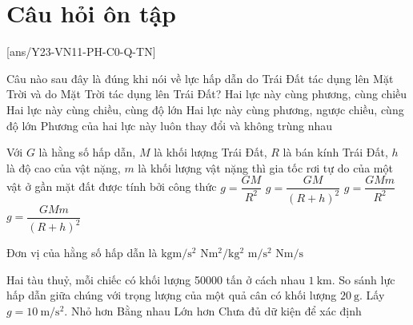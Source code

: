 \chapter{Câu hỏi ôn tập}
[ans/Y23-VN11-PH-C0-Q-TN]
\begin{ex}
	Câu nào sau đây là đúng khi nói về lực hấp dẫn do Trái Đất tác dụng lên Mặt Trời và do Mặt Trời tác dụng lên Trái Đất?
	\choice
	{Hai lực này cùng phương, cùng chiều}
	{Hai lực này cùng chiều, cùng độ lớn}
	{\True Hai lực này cùng phương, ngược chiều, cùng độ lớn}
	{Phương của hai lực này luôn thay đổi và không trùng nhau}
	\loigiai{}
\end{ex}
\begin{ex}
Với $G$ là hằng số hấp dẫn, $M$ là khối lượng Trái Đất, $R$ là bán kính Trái Đất, $h$ là độ cao của vật nặng, $m$ là khối lượng vật nặng thì gia tốc rơi tự do của một vật ở gần mặt đất được tính bởi công thức	
	\choice
	{\True $g=\dfrac{GM}{R^2}$}
	{$g=\dfrac{GM}{\left(R+h\right)^2}$}
	{$g=\dfrac{GMm}{R^2}$}
	{$g=\dfrac{GMm}{\left(R+h\right)^2}$}
	\loigiai{}
\end{ex}
\begin{ex}
	Đơn vị của hằng số hấp dẫn là
	\choice
	{$\si{\kilogram\meter/\second^2}$}
	{\True $\si{\newton\meter^2/\kilogram^2}$}
	{$\si{\meter/\second^2}$}
	{$\si{\newton\meter/\second}$}
	\loigiai{}
\end{ex}
\begin{ex}
	Hai tàu thuỷ, mỗi chiếc có khối lượng 50000 tấn ở cách nhau $\SI{1}{\kilo\meter}$. So sánh lực hấp dẫn giữa chúng với trọng lượng của một quả cân có khối lượng $\SI{20}{\gram}$. Lấy $g=\SI{10}{\meter/\second^2}$.
	\choice
	{\True Nhỏ hơn}
	{Bằng nhau}
	{Lớn hơn}
	{Chưa đủ dữ kiện để xác định}
\end{ex}
